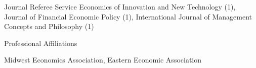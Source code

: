 \documentclass{resume} %
\begin{document}
\begin{rSection}{Journal Referee Service}
	Economics of Innovation and New Technology (1), Journal of Financial Economic Policy (1), International Journal of Management Concepts and Philosophy (1)
\end{rSection}

\begin{rSection}{Professional Affiliations}


	Midwest Economics Association, Eastern Economic Association
\end{rSection}




 	
 


\end{document}
